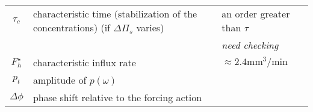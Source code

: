 \documentclass[11pt]{article}
\begin{document}
\begin{center}
\begin{tabular}{|c|p{}|l|}
\hline
\hline
$\tau_c$ & characteristic time (stabilization of the concentrations) (if $\Delta \Pi_s $ varies)&an order greater than $\tau$ \\ &&\textit{need checking}\\
\hline
$F_h^\star$ & characteristic influx rate & $\approx 2.4 \mathrm{mm}^3/\mathrm{min}$\\
\hline
$p_t$ & amplitude of $p(\omega)$&\\
\hline
$\Delta \phi$ & phase shift relative to the forcing action& \\
\hline

\end{tabular}
\end{center}
%
%
\end{document}
